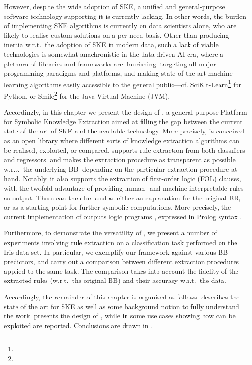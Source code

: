 \documentclass[12pt,a4paper,openright,twoside]{book}
\begin{document}
%
However, despite the wide adoption of SKE, a unified and general-purpose software technology supporting it is currently lacking.
%
In other words, the burden of implementing SKE algorithms is currently on data scientists alone, who are likely to realise custom solutions on a per-need basis.
%
Other than producing inertia w.r.t.\ the adoption of SKE in modern data, such a lack of viable technologies is somewhat anachronistic in the data-driven AI era, where a plethora of libraries and frameworks are flourishing, targeting all major programming paradigms and platforms, and making state-of-the-art machine learning algorithms easily accessible to the general public---cf. SciKit-Learn\footnote{} for Python, or Smile\footnote{} for the Java Virtual Machine (JVM).

Accordingly, in this chapter we present the design of \psyke{}, a general-purpose Platform for Symbolic Knowledge Extraction aimed at filling the gap between the current state of the art of SKE and the available technology.
%
More precisely, \psyke{} is conceived as an open library where different sorts of knowledge extraction algorithms can be realised, exploited, or compared.
%
\psyke{} supports rule extraction from both classifiers and regressors, and makes the extraction procedure as transparent as possible w.r.t.\ the underlying BB, depending on the particular extraction procedure at hand.
%
Notably, it also supports the extraction of first-order logic (FOL) clauses, with the twofold advantage of providing human- and machine-interpretable rules as output.
%
These can then be used as either an explanation for the original BB, or as a starting point for further symbolic computations.
%
More precisely, the current implementation of \psyke{} outputs logic programs \cite{lloyd1990computational,metakides1996principles}, expressed in Prolog syntax \cite{ColmerauerR93}.

Furthermore, to demonstrate the versatility of \psyke{}, we present a number of experiments involving rule extraction on a classification task performed on the Iris data set.
%
In particular, we exemplify our framework against various BB predictors, and carry out a comparison between different extraction procedures applied to the same task.
%
The comparison takes into account the fidelity of the extracted rules (w.r.t.\ the original BB) and their accuracy w.r.t.\ the data.%

Accordingly, the remainder of this chapter is organised as follows.
%
 describes the state of the art for SKE as well as some background notion to fully understand the work.
%
 presents the design of \psyke{}, while in  some use cases showing how \psyke{} can be exploited are reported.
%
Conclusions are drawn in .
\end{document}
